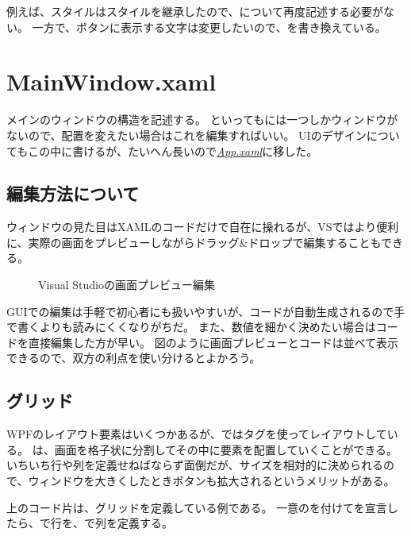 \documentclass[letterpaper,10pt,dvipdfmx]{sphinxmanual}
\begin{document}
例えば、スタイルはスタイルを継承したので、について再度記述する必要がない。
一方で、ボタンに表示する文字は変更したいので、を書き換えている。


\section{MainWindow.xaml}
\label{\detokenize{nissyu-idohen/pc-software-code:mainwindow-xaml}}
メインのウィンドウの構造を記述する。
といってもには一つしかウィンドウがないので、配置を変えたい場合はこれを編集すればいい。
UIのデザインについてもこの中に書けるが、たいへん長いので{\hyperref[\detokenize{nissyu-idohen/pc-software-code:app-xaml}]{\emph{App.xaml}}}に移した。


\subsection{編集方法について}
\label{\detokenize{nissyu-idohen/pc-software-code:id6}}
ウィンドウの見た目はXAMLのコードだけで自在に操れるが、VSではより便利に、実際の画面をプレビューしながらドラッグ\&ドロップで編集することもできる。
\begin{figure}[htbp]
\centering
\capstart

\noindent{}
\caption{Visual Studioの画面プレビュー編集}\label{\detokenize{nissyu-idohen/pc-software-code:id19}}\end{figure}

GUIでの編集は手軽で初心者にも扱いやすいが、コードが自動生成されるので手で書くよりも読みにくくなりがちだ。
また、数値を細かく決めたい場合はコードを直接編集した方が早い。
図のように画面プレビューとコードは並べて表示できるので、双方の利点を使い分けるとよかろう。


\subsection{グリッド}
\label{\detokenize{nissyu-idohen/pc-software-code:id7}}
WPFのレイアウト要素はいくつかあるが、ではタグを使ってレイアウトしている。
は、画面を格子状に分割してその中に要素を配置していくことができる。
いちいち行や列を定義せねばならず面倒だが、サイズを相対的に決められるので、ウィンドウを大きくしたときボタンも拡大されるというメリットがある。

上のコード片は、グリッドを定義している例である。
一意のを付けてを宣言したら、で行を、で列を定義する。
\end{document}
